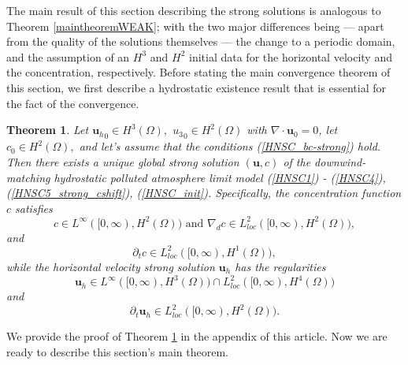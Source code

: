 \documentclass[11pt, a4paper]{article}
\newtheorem{theorem}{Theorem}
\begin{document}
The main result of this section describing the strong solutions is analogous to Theorem \ref{maintheoremWEAK}; with the two major differences being --- apart from the quality of the solutions themselves --- the change to a periodic domain, and the assumption of an $H^3$ and $H^2$ initial data for the horizontal velocity and the concentration, respectively. Before stating the main convergence theorem of this section, we first describe a hydrostatic existence result that is essential for the fact of the convergence.

\begin{theorem} \label{existenceconcentrationSTRONG}
Let ${\mathbf{u}_h}_0 \in H^3(\Omega),$ ${u_3}_0 \in H^2(\Omega)$ with $\nabla \cdot \mathbf{u}_0 = 0$, let $c_0 \in H^2 (\Omega),$ and let's assume that the  conditions (\ref{HNSC_bc-strong}) hold. Then there exists a unique global strong solution $(\mathbf{u}, c)$ of the downwind-matching hydrostatic polluted atmosphere limit model (\ref{HNSC1}) - (\ref{HNSC4}), (\ref{HNSC5_strong_cshift}), (\ref{HNSC_init}). Specifically, the concentration function $c$ satisfies
%
\begin{equation} \label{regularity_c_first}
c \in L^\infty([0, \infty), H^2(\Omega)) \text{ and } \nabla_d c \in L^2_{loc}([0, \infty), H^2(\Omega)),
\end{equation}
%
and
%
\begin{equation}
\partial_t c \in L^2_{loc}([0, \infty), H^1(\Omega)),
\end{equation}
%
while the horizontal velocity strong solution $\mathbf{u}_h$ has the regularities
%
\begin{equation} \label{u_regularities_first}
\mathbf{u}_h \in L^\infty([0, \infty), H^3(\Omega)) \cap L^2_{loc}([0, \infty), H^4(\Omega))
\end{equation}
%
and
%
\begin{equation} \label{u_regularities_second}
\partial_t \mathbf{u}_h \in L^2_{loc}([0, \infty), H^2(\Omega)).
\end{equation}
%
\end{theorem}
We provide the proof of Theorem \ref{existenceconcentrationSTRONG} in the appendix of this article. Now we are ready to describe this section's main theorem.
\end{document}
